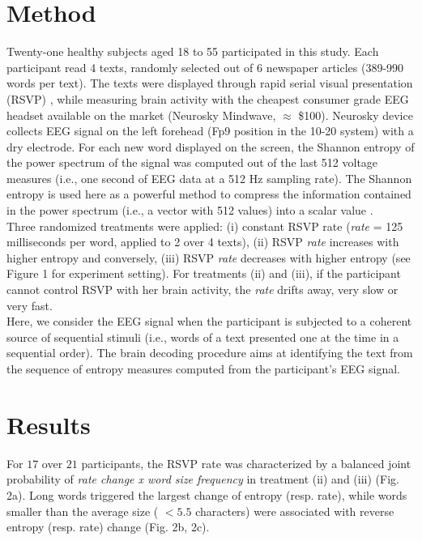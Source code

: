 \documentclass[10pt]{article}
\begin{document}
\section{Method}
Twenty-one healthy subjects aged 18 to 55 participated in this study. Each participant read 4 texts, randomly selected out of 6 newspaper articles (389-990 words per text). The texts were displayed through rapid serial visual presentation (RSVP) \cite{potter1984rapid,potter1975time}, while measuring brain activity with the cheapest consumer grade EEG headset available on the market (Neurosky Mindwave,  $\approx$ \$100). Neurosky device collects EEG signal on the left forehead (Fp9 position in the 10-20 system) with a dry electrode. For each new word displayed on the screen, the Shannon entropy of the power spectrum of the signal \cite{Tellenbach2009Beyond} was computed out of the last 512 voltage measures (i.e., one second of EEG data at a 512 Hz sampling rate). The Shannon entropy is used here as a powerful method to compress the information contained in the power spectrum (i.e., a vector with 512 values) into a scalar value \cite{ornstein1993entropy}.  \\

Three randomized treatments were applied:  (i) constant RSVP rate ({\it rate} = 125 milliseconds per word, applied to 2 over 4 texts), (ii) RSVP {\it rate}  increases with higher entropy and conversely, (iii) RSVP {\it rate}  decreases with higher entropy (see Figure 1 for experiment setting). For treatments (ii) and (iii), if the participant cannot control RSVP with her brain activity, the {\it rate} drifts away, very slow or very fast.\\

Here, we consider the EEG signal when the participant is subjected to a coherent source of sequential stimuli (i.e., words of a text presented one at the time in a sequential order). The brain decoding procedure aims at identifying the text from the sequence of entropy measures computed from the participant's EEG signal.\\

\section{Results}
For $17$ over $21$ participants, the RSVP rate was characterized by a balanced joint probability of {\it rate change x word size frequency} in treatment (ii) and (iii) (Fig. 2a). Long words triggered the largest change of entropy (resp. rate), while words smaller than the average size ( $< 5.5$ characters) were associated with reverse entropy (resp. rate) change (Fig. 2b, 2c).\\
\end{document}
